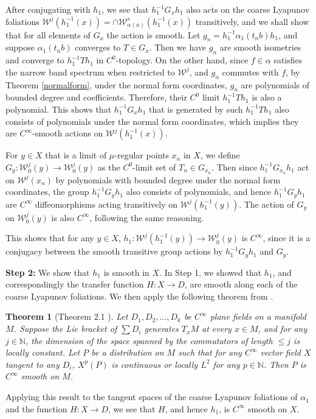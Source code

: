 \documentclass[11pt]{amsart}
\numberwithin{equation}{section}
\newcommand{\N}{\mathbb{N}}
\newcommand{\W}{\mathcal{W}}
\theoremstyle{plain}
\newtheorem{thm}{Theorem}[section]
\begin{document}
After conjugating with $h_1$, we see that $h_1^{-1}G_x h_1$ also acts on the coarse Lyapunov foliations $\W^j(h_1^{-1}(x))=\cap \W^s_{\alpha(a)}(h_1^{-1}(x))$ transitively, and we shall show that for all elements of $G_x$ the action is smooth. Let $g_n=h_1^{-1}\alpha_1(t_n b)h_1$, and suppose $\alpha_1(t_n b)$ converges to $T\in G_x$. Then we have $g_n$ are smooth isometries and converge to $h_1^{-1}Th_1$ in $C^0$-topology. On the other hand, since $f\in \alpha$ satisfies the narrow band spectrum when restricted to $\W^j$, and $g_n$ commutes with $f$, by Theorem \ref{normalform}, under the normal form coordinates, $g_n$ are polynomials of bounded degree and coefficients. Therefore, their $C^0$ limit $h_1^{-1}Th_1$ is also a polynomial. This shows that $h_1^{-1}G_x h_1$ that is generated by such $h_1^{-1}Th_1$ also consists of polynomials under the normal form coordinates, which implies they are $C^\infty$-smooth actions on $\W^j(h_1^{-1}(x))$.

For $y\in X$ that is a limit of $\mu$-regular points $x_n$ in $X$, we define $G_y: \W^j_0(y)\to \W^j_0(y)$ as the $C^0$-limit set of $T_n\in G_{x_n}$. Then since $h_1^{-1}G_{x_n}h_1$ act on $\W^j(x_n)$ by polynomials with bounded degree under the normal form coordinates, the group $h_1^{-1}G_y h_1$ also consists of polynomials, and hence $h_1^{-1}G_y h_1$ are $C^\infty$ diffeomorphisms acting transitively on $\W^j(h_1^{-1}(y))$. The action of $G_y$ on $\W^j_0(y)$ is also $C^\infty$, following the same reasoning.

This shows that for any $y\in X$, $h_1: \W^j(h_1^{-1}(y)) \to \W^j_0(y)$ is $C^\infty$, since it is a conjugacy between the smooth transitive group actions by $h_1^{-1}G_y h_1$ and $G_y$. 

\textbf{Step 2:} We show that $h_1$ is smooth in $X$. In Step 1, we showed that $h_1$, and correspondingly the transfer function $H:X\to D$, are smooth along each of the coarse Lyapunov foliations. We then apply the following theorem from \cite{KSpat}.

\begin{thm}[Theorem 2.1 \cite {KSpat}]
Let $D_1,D_2,...,D_k$ be $C^\infty$ plane fields on a manifold $M$. Suppose the Lie bracket of $\sum D_i$ generates $T_x M$ at every $x\in M$, and for any $j\in \N$, the dimension of the space spanned by the commutators of length $\le j$ is locally constant. Let $P$ be a distribution on $M$ such that for any $C^\infty$ vector field $X$ tangent to any $D_i$, $X^p(P)$ is continuous or locally $L^2$ for any $p\in \N$. Then $P$ is $C^\infty$ smooth on $M$.
\end{thm}

Applying this result to the tangent spaces of the coarse Lyapunov foliations of $\alpha_1$ and the function $H:X\to D$, we see that $H$, and hence $h_1$, is $C^\infty$ smooth on $X$.


 
{}

\end{document}
